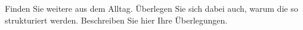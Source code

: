 %
%
Finden Sie weitere  aus dem Alltag. Überlegen Sie sich dabei auch, warum die  so strukturiert werden. Beschreiben Sie hier Ihre Überlegungen.
